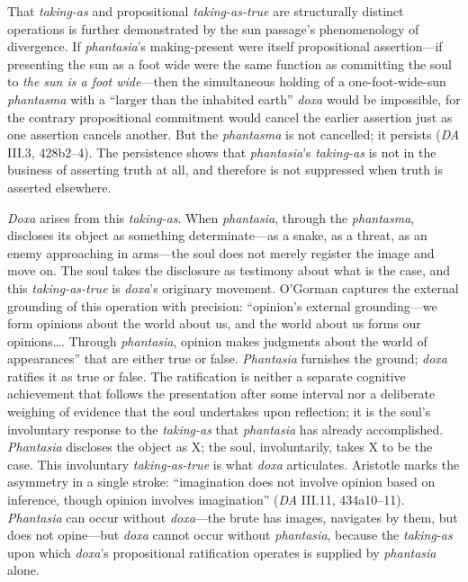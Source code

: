 That \textit{taking-as} and propositional \textit{taking-as-true} are structurally distinct operations is further demonstrated by the sun passage's phenomenology of divergence. If \textit{phantasia}'s making-present were itself propositional assertion---if presenting the sun as a foot wide were the same function as committing the soul to \textit{the sun is a foot wide}---then the simultaneous holding of a one-foot-wide-sun \textit{phantasma} with a ``larger than the inhabited earth'' \textit{doxa} would be impossible, for the contrary propositional commitment would cancel the earlier assertion just as one assertion cancels another. But the \textit{phantasma} is not cancelled; it persists (\textit{DA} III.3, 428b2--4). The persistence shows that \textit{phantasia}'s \textit{taking-as} is not in the business of asserting truth at all, and therefore is not suppressed when truth is asserted elsewhere.


\textit{Doxa} arises from this \textit{taking-as}. When \textit{phantasia}, through the \textit{phantasma}, discloses its object as something determinate---as a snake, as a threat, as an enemy approaching in arms---the soul does not merely register the image and move on. The soul takes the disclosure as testimony about what is the case, and this \textit{taking-as-true} is \textit{doxa}'s originary movement. O'Gorman captures the external grounding of this operation with precision: ``opinion's external grounding---we form opinions about the world about us, and the world about us forms our opinions\ldots. Through \textit{phantasia}, opinion makes judgments about the world of appearances'' \autocite[25]{ogorman_aristotles_phantasia} that are either true or false. \textit{Phantasia} furnishes the ground; \textit{doxa} ratifies it as true or false. The ratification is neither a separate cognitive achievement that follows the presentation after some interval nor a deliberate weighing of evidence that the soul undertakes upon reflection; it is the soul's involuntary response to the \textit{taking-as} that \textit{phantasia} has already accomplished. \textit{Phantasia} discloses the object as X; the soul, involuntarily, takes X to be the case. This involuntary \textit{taking-as-true} is what \textit{doxa} articulates. Aristotle marks the asymmetry in a single stroke: ``imagination does not involve opinion based on inference, though opinion involves imagination'' (\textit{DA} III.11, 434a10--11). \textit{Phantasia} can occur without \textit{doxa}---the brute has images, navigates by them, but does not opine---but \textit{doxa} cannot occur without \textit{phantasia}, because the \textit{taking-as} upon which \textit{doxa}'s propositional ratification operates is supplied by \textit{phantasia} alone.

